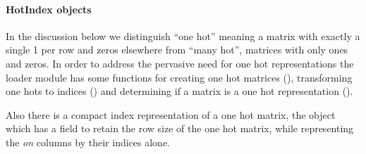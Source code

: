 \documentclass[letterpaper,10pt,english]{sphinxmanual}
\begin{document}
\paragraph{HotIndex objects}
\label{loader_tutorial:hotindex-objects}
In the discussion below we distinguish ``one hot'' meaning a matrix with exactly a single 1 per row and zeros elsewhere
from ``many hot'', matrices with only ones and zeros.
In order to address the pervasive need for one hot representations the loader module has some functions for creating
one hot matrices ({\hyperref[loader:loader.toOnehot]{\emph{}}}), transforming one hots to indices ({\hyperref[loader:loader.toIndex]{\emph{}}}) and determining if a matrix is
a one hot representation ({\hyperref[loader:loader.is_one_hot]{\emph{}}}).

Also there is a compact index representation of a one hot matrix, the {\hyperref[loader:loader.HotIndex]{\emph{}}} object which has a field to
retain the row size of the one hot matrix, while representing the \emph{on} columns by their indices alone.
\end{document}
